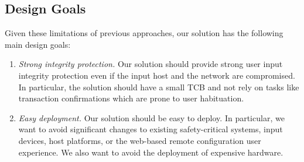 \subsection{Design Goals}

Given these limitations of previous approaches, our solution has the following main design goals: 

\begin{enumerate}
    \item \emph{Strong integrity protection.} Our solution should provide strong user input integrity protection even if the input host and the network are compromised. In particular, the solution should have a small TCB and not rely on tasks like transaction confirmations which are prone to user habituation. 

    \item \emph{Easy deployment.} Our solution should be easy to deploy. In particular, we want to avoid significant changes to existing safety-critical systems, input devices, host platforms, or the web-based remote configuration user experience. We also want to avoid the deployment of expensive hardware.
\end{enumerate}




